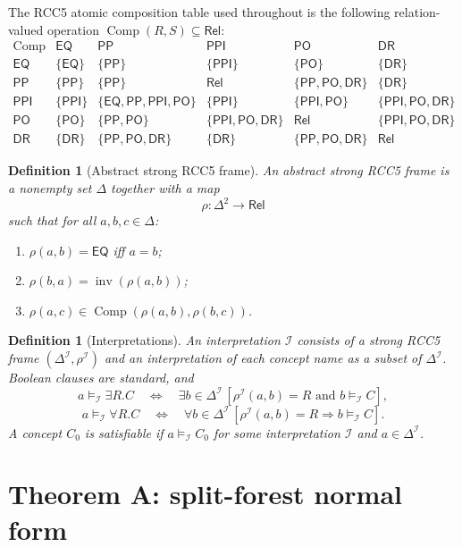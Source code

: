 \documentclass[11pt]{article}
\newtheorem{definition}[theorem]{Definition}
\newcommand{\Rel}{\mathsf{Rel}}
\newcommand{\EQ}{\mathsf{EQ}}
\newcommand{\PP}{\mathsf{PP}}
\newcommand{\PPI}{\mathsf{PPI}}
\newcommand{\PO}{\mathsf{PO}}
\newcommand{\DR}{\mathsf{DR}}
\newcommand{\Comp}{\operatorname{Comp}}
\newcommand{\Inv}{\operatorname{inv}}
\begin{document}
The RCC5 atomic composition table used throughout is the following relation-valued operation $\Comp(R,S)\subseteq\Rel$:
\[
\begin{array}{c|ccccc}
\Comp & \EQ & \PP & \PPI & \PO & \DR\\
\hline
\EQ  & \{\EQ\} & \{\PP\} & \{\PPI\} & \{\PO\} & \{\DR\}\\
\PP  & \{\PP\} & \{\PP\} & \Rel & \{\PP,\PO,\DR\} & \{\DR\}\\
\PPI & \{\PPI\} & \{\EQ,\PP,\PPI,\PO\} & \{\PPI\} & \{\PPI,\PO\} & \{\PPI,\PO,\DR\}\\
\PO  & \{\PO\} & \{\PP,\PO\} & \{\PPI,\PO,\DR\} & \Rel & \{\PPI,\PO,\DR\}\\
\DR  & \{\DR\} & \{\PP,\PO,\DR\} & \{\DR\} & \{\PP,\PO,\DR\} & \Rel
\end{array}
\]

\begin{definition}[Abstract strong RCC5 frame]
An abstract strong RCC5 frame is a nonempty set $\Delta$ together with a map
\[
  \rho:\Delta^2\to\Rel
\]
such that for all $a,b,c\in\Delta$:
\begin{enumerate}[label=(R\arabic*)]
\item $\rho(a,b)=\EQ$ iff $a=b$;
\item $\rho(b,a)=\Inv(\rho(a,b))$;
\item $\rho(a,c)\in\Comp(\rho(a,b),\rho(b,c))$.
\end{enumerate}
\end{definition}

\begin{definition}[Interpretations]
An interpretation $\mathcal I$ consists of a strong RCC5 frame $(\Delta^\mathcal I,\rho^\mathcal I)$ and an interpretation of each concept name as a subset of $\Delta^\mathcal I$.  Boolean clauses are standard, and
\[
 a\models_\mathcal I \exists R.C
 \quad\Longleftrightarrow\quad
 \exists b\in\Delta^\mathcal I\,[\rho^\mathcal I(a,b)=R\text{ and }b\models_\mathcal I C],
\]
\[
 a\models_\mathcal I \forall R.C
 \quad\Longleftrightarrow\quad
 \forall b\in\Delta^\mathcal I\,[\rho^\mathcal I(a,b)=R\Rightarrow b\models_\mathcal I C].
\]
A concept $C_0$ is satisfiable if $a\models_\mathcal I C_0$ for some interpretation $\mathcal I$ and $a\in\Delta^\mathcal I$.
\end{definition}

\section{Theorem A: split-forest normal form}
\end{document}

